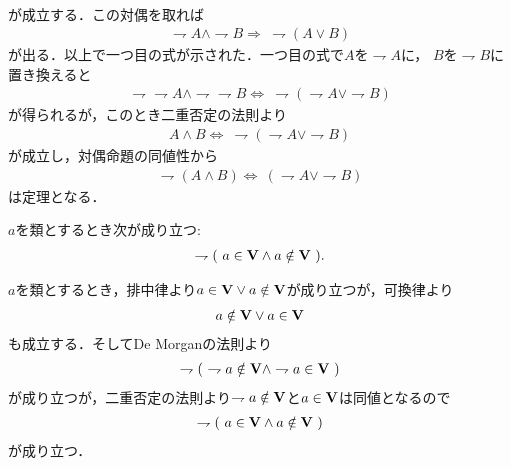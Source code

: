 \begin{prf}
\begin{align}
		\end{align}
		が成立する．この対偶を取れば
		\begin{align}
			\rightharpoondown A \wedge \rightharpoondown B
			\Longrightarrow\ \rightharpoondown (A \vee B)
		\end{align}
		が出る．以上で一つ目の式が示された．一つ目の式で$A$を$\rightharpoondown A$に，
		$B$を$\rightharpoondown B$に置き換えると
		\begin{align}
			\rightharpoondown \rightharpoondown A \wedge \rightharpoondown \rightharpoondown B
			\Longleftrightarrow\ \rightharpoondown (\rightharpoondown A \vee \rightharpoondown B)
		\end{align}
		が得られるが，このとき二重否定の法則より
		\begin{align}
			A \wedge B
			\Longleftrightarrow\ \rightharpoondown (\rightharpoondown A \vee \rightharpoondown B)
		\end{align}
		が成立し，対偶命題の同値性から
		\begin{align}
			\rightharpoondown (A \wedge B)
			\Longleftrightarrow\ (\rightharpoondown A \vee \rightharpoondown B)
		\end{align}
		は定理となる．
		\QED
	\end{prf}
	
	
	\begin{screen}
		\begin{thm}[集合でも真類でもない類は存在しない]
			$a$を類とするとき次が成り立つ:
			\begin{align}
				\rightharpoondown (\ a \in \Univ \wedge a \notin \Univ\ ).
			\end{align}
		\end{thm}
	\end{screen}
	
	\begin{prf}
		$a$を類とするとき，排中律より$a \in \mathbf{V} \vee a \notin \mathbf{V}$が成り立つが，可換律より
		\begin{align}
			a \notin \mathbf{V} \vee a \in \mathbf{V}
		\end{align}
		も成立する．そしてDe Morganの法則より
		\begin{align}
			\rightharpoondown (\ \rightharpoondown a \notin \mathbf{V} \wedge \rightharpoondown a \in \mathbf{V}\ )
		\end{align}
		が成り立つが，二重否定の法則より$\rightharpoondown a \notin \mathbf{V}$と$a \in \mathbf{V}$は同値となるので
		\begin{align}
			\rightharpoondown (\ a \in \mathbf{V} \wedge a \notin \mathbf{V}\ )
		\end{align}
		が成り立つ．
		\QED
	\end{prf}
	
